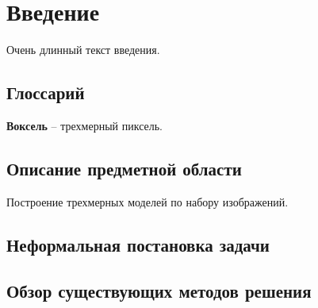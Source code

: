 \section{Введение}
Очень длинный текст введения.

\subsection{Глоссарий}
\textbf{Воксель} -- трехмерный пиксель.

\subsection{Описание предметной области}
Построение трехмерных моделей по набору изображений.

\subsection{Неформальная постановка задачи}

\subsection{Обзор существующих методов решения}


